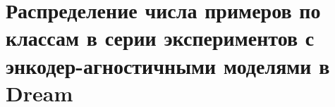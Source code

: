 \chapter{Распределение числа примеров по классам в серии экспериментов с энкодер-агностичными моделями в Dream}
\label{appendix:dream-tr-ag-sizes}
\begin{table}[]
\caption{Pаспределение числа тренировочных примеров по классам в серии экспериментов с энкодер-агностичными моделями в Dream. Глава~\ref{ch:mtldream}. Классификация эмоций.}
\label{appendix:emo_tr-ag}
\end{table}
\begin{table}[]
\caption{Pаспределение числа тренировочных примеров по классам в серии экспериментов с энкодер-агностичными моделями в Dream. Глава~\ref{ch:mtldream}. Классификация тональности.}
\label{appendix:sentiment_tr-ag}
\end{table}

